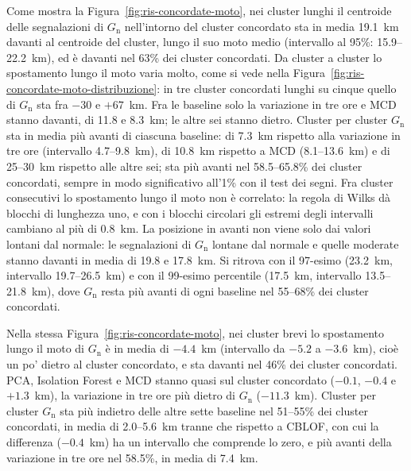 Come mostra la Figura~\ref{fig:ris-concordate-moto}, nei cluster lunghi il centroide delle segnalazioni di $G_{\mathrm{n}}$ nell'intorno del cluster concordato sta in media 19.1~km davanti al centroide del cluster, lungo il suo moto medio (intervallo al 95\%: 15.9--22.2~km), ed è davanti nel 63\% dei cluster concordati. Da cluster a cluster lo spostamento lungo il moto varia molto, come si vede nella Figura~\ref{fig:ris-concordate-moto-distribuzione}: in tre cluster concordati lunghi su cinque quello di $G_{\mathrm{n}}$ sta fra $-30$ e $+67$~km. Fra le baseline solo la variazione in tre ore e MCD stanno davanti, di 11.8 e 8.3~km; le altre sei stanno dietro. Cluster per cluster $G_{\mathrm{n}}$ sta in media più avanti di ciascuna baseline: di 7.3~km rispetto alla variazione in tre ore (intervallo 4.7--9.8~km), di 10.8~km rispetto a MCD (8.1--13.6~km) e di 25--30~km rispetto alle altre sei; sta più avanti nel 58.5--65.8\% dei cluster concordati, sempre in modo significativo all'1\% con il test dei segni. Fra cluster consecutivi lo spostamento lungo il moto non è correlato: la regola di Wilks dà blocchi di lunghezza uno, e con i blocchi circolari gli estremi degli intervalli cambiano al più di 0.8~km. La posizione in avanti non viene solo dai valori lontani dal normale: le segnalazioni di $G_{\mathrm{n}}$ lontane dal normale e quelle moderate stanno davanti in media di 19.8 e 17.8~km. Si ritrova con il 97-esimo (23.2~km, intervallo 19.7--26.5~km) e con il 99-esimo percentile (17.5~km, intervallo 13.5--21.8~km), dove $G_{\mathrm{n}}$ resta più avanti di ogni baseline nel 55--68\% dei cluster concordati.

Nella stessa Figura~\ref{fig:ris-concordate-moto}, nei cluster brevi lo spostamento lungo il moto di $G_{\mathrm{n}}$ è in media di $-4.4$~km (intervallo da $-5.2$ a $-3.6$~km), cioè un po' dietro al cluster concordato, e sta davanti nel 46\% dei cluster concordati. PCA, Isolation Forest e MCD stanno quasi sul cluster concordato ($-0.1$, $-0.4$ e $+1.3$~km), la variazione in tre ore più dietro di $G_{\mathrm{n}}$ ($-11.3$~km). Cluster per cluster $G_{\mathrm{n}}$ sta più indietro delle altre sette baseline nel 51--55\% dei cluster concordati, in media di 2.0--5.6~km tranne che rispetto a CBLOF, con cui la differenza ($-0.4$~km) ha un intervallo che comprende lo zero, e più avanti della variazione in tre ore nel 58.5\%, in media di 7.4~km.

